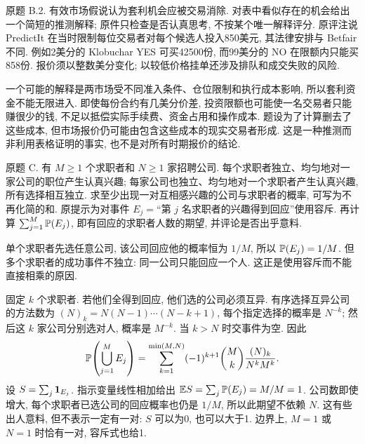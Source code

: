 \begin{exercise}\label{ps2-b2}
原题 B.2. 有效市场假说认为套利机会应被交易消除. 对表中看似存在的机会给出一个简短的推测解释; 原件只检查是否认真思考, 不按某个唯一解释评分. 原评注说 PredictIt 在当时限制每位交易者对每个候选人投入850美元, 其法律安排与 Betfair 不同. 例如2美分的 Klobuchar YES 可买42500份, 而99美分的 NO 在限额内只能买858份. 报价须以整数美分变化; 以较低价格挂单还涉及排队和成交失败的风险.
\end{exercise}
\begin{solution}
一个可能的解释是两市场受不同准入条件、仓位限制和执行成本影响, 所以套利资金不能无限进入. 即使每份合约有几美分价差, 投资限额也可能使一名交易者只能赚很少的钱, 不足以抵偿实际手续费、资金占用和操作成本. 题设为了计算删去了这些成本, 但市场报价仍可能由包含这些成本的现实交易者形成. 这是一种推测而非利用表格证明的事实, 也不是对所有时期报价的结论.
\end{solution}

\begin{exercise}\label{ps2-c}
原题 C. 有 $M\ge1$ 个求职者和 $N\ge1$ 家招聘公司. 每个求职者独立、均匀地对一家公司的职位产生认真兴趣; 每家公司也独立、均匀地对一个求职者产生认真兴趣, 所有选择相互独立. 求至少出现一对互相感兴趣的公司与求职者的概率, 可写为不再化简的和. 原提示为对事件 $E_j=$“第 $j$ 名求职者的兴趣得到回应”使用容斥. 再计算 $\sum_{j=1}^M\mathbb P(E_j)$, 即有回应的求职者人数的期望, 并评论是否出乎意料.
\end{exercise}
\begin{solution}
单个求职者先选任意公司, 该公司回应他的概率恒为 $1/M$, 所以 $\mathbb P(E_j)=1/M$. 但多个求职者的成功事件不独立: 同一公司只能回应一个人. 这正是使用容斥而不能直接相乘的原因.

固定 $k$ 个求职者. 若他们全得到回应, 他们选的公司必须互异. 有序选择互异公司的方法数为 $(N)_k=N(N-1)\cdots(N-k+1)$, 每个指定选择的概率是 $N^{-k}$; 然后这 $k$ 家公司分别选对人, 概率是 $M^{-k}$. 当 $k>N$ 时交事件为空. 因此
\[
\mathbb P\!\left(\bigcup_{j=1}^M E_j\right)
=\sum_{k=1}^{\min(M,N)}(-1)^{k+1}\binom Mk\frac{(N)_k}{N^kM^k}.
\]
设 $S=\sum_j\mathbf 1_{E_j}$. 指示变量线性相加给出
$\mathbb E S=\sum_j\mathbb P(E_j)=M/M=1$.
公司数即使增大, 每个求职者已选公司的回应概率也仍是 $1/M$, 所以此期望不依赖 $N$. 这有些出人意料, 但不表示一定有一对: $S$ 可以为0, 也可以大于1. 边界上, $M=1$ 或 $N=1$ 时恰有一对, 容斥式也给1.
\end{solution}

